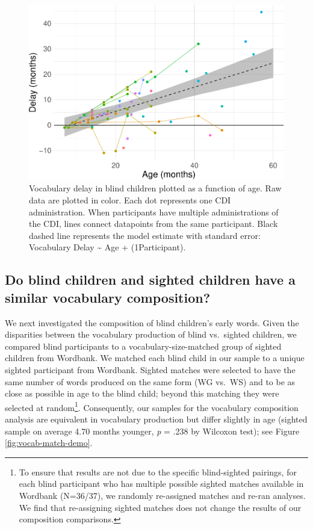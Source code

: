\documentclass[
  man,floatsintext]{apa6}
\begin{document}
\begin{figure}
\centering
\includegraphics{VI_CDI_manuscript_files/figure-latex/longitudinal-plot-1.pdf}
\caption{\label{fig:longitudinal-plot}Vocabulary delay in blind children plotted as a function of age. Raw data are plotted in color. Each dot represents one CDI administration. When participants have multiple administrations of the CDI, lines connect datapoints from the same participant. Black dashed line represents the model estimate with standard error: Vocabulary Delay \textasciitilde{} Age + (1\textbar Participant).}
\end{figure}

\hypertarget{do-blind-children-and-sighted-children-have-a-similar-vocabulary-composition}{%
\subsection{Do blind children and sighted children have a similar vocabulary composition?}\label{do-blind-children-and-sighted-children-have-a-similar-vocabulary-composition}}

We next investigated the composition of blind children's early words. Given the disparities between the vocabulary production of blind vs.~sighted children, we compared blind participants to a vocabulary-size-matched group of sighted children from Wordbank. We matched each blind child in our sample to a unique sighted participant from Wordbank. Sighted matches were selected to have the same number of words produced on the same form (WG vs.~WS) and to be as close as possible in age to the blind child; beyond this matching they were selected at random\footnote{To ensure that results are not due to the specific blind-sighted pairings, for each blind participant who has multiple possible sighted matches available in Wordbank (N=36/37), we randomly re-assigned matches and re-ran analyses. We find that re-assigning sighted matches does not change the results of our composition comparisons.}. Consequently, our samples for the vocabulary composition analysis are equivalent in vocabulary production but differ slightly in age (sighted sample on average 4.70 months younger, \emph{p} = .238 by Wilcoxon test); see Figure \ref{fig:vocab-match-demo}.
\end{document}
